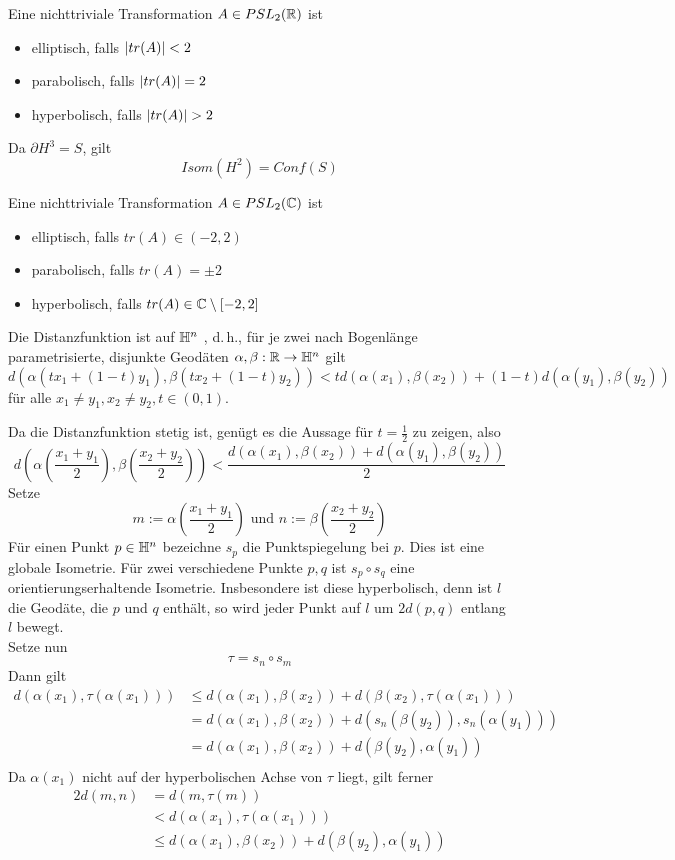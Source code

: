 \documentclass{book}
\begin{document}
\Prop{}
Eine nichttriviale Transformation $A \in PSL_2(\mathbb{R})$ ist
\begin{itemize}
	\item elliptisch, falls $\left|tr(A)\right| < 2$
	\item parabolisch, falls $\left|tr(A)\right| = 2$
	\item hyperbolisch, falls $\left|tr(A)\right| > 2$
\end{itemize}

\Prop{}
Da $\partial H^3 = S$, gilt
\[ Isom(H^2) = Conf(S) \]

\Prop{}
Eine nichttriviale Transformation $A \in PSL_2(\mathbb{C})$ ist
\begin{itemize}
	\item elliptisch, falls $tr(A) \in (-2, 2)$
	\item parabolisch, falls $tr(A) = \pm 2$
	\item hyperbolisch, falls $tr(A) \in \mathbb{C}\setminus [-2, 2]$
\end{itemize}

\Prop{}
Die Distanzfunktion ist auf $\mathbb{H}^n$ , d.\,h., für je zwei nach Bogenlänge parametrisierte, disjunkte Geodäten $\alpha, \beta : \mathbb{R} \overset{}{\rightarrow} \mathbb{H}^n$ gilt
\[ d(\alpha(t  x_1 + (1-t)  y_1), \beta(t  x_2 + (1-t)  y_2) ) < t  d(\alpha(x_1), \beta(x_2)) + (1-t)  d(\alpha(y_1), \beta(y_2) ) \]
für alle $x_1 \neq y_1, x_2 \neq y_2, t \in (0,1)$.
\begin{Beweis}{}
	Da die Distanzfunktion stetig ist, genügt es die Aussage für $t = \frac{1}{2}$ zu zeigen, also
	\[ d(\alpha(\frac{x_1 + y_1}{2}), \beta(\frac{x_2 + y_2}{2})) < \frac{d(\alpha(x_1), \beta(x_2) ) + d(\alpha(y_1), \beta(y_2))}{2}  \]
	Setze
	\[ m:= \alpha(\frac{x_1 + y_1}{2})  \text{ und }n:= \beta(\frac{x_2 + y_2}{2}) \]
	Für einen Punkt $p \in \mathbb{H}^n$ bezeichne $s_p$ die Punktspiegelung bei $p$. Dies ist eine globale Isometrie. Für zwei verschiedene Punkte $p,q$ ist $s_p \circ s_q$ eine orientierungserhaltende Isometrie. Insbesondere ist diese hyperbolisch, denn ist $l$ die Geodäte, die $p$ und $q$ enthält, so wird jeder Punkt auf $l$ um $2d(p,q)$ entlang $l$ bewegt.\\
	Setze nun
	\[ \tau = s_n \circ s_m \]
	Dann gilt
	\begin{align*}
	d(\alpha(x_1), \tau(\alpha(x_1)) ) & \leq d(\alpha(x_1), \beta(x_2) ) + d( \beta(x_2), \tau(\alpha(x_1)) )\\
	&=d(\alpha(x_1), \beta(x_2) ) + d(  s_n(\beta(y_2))  , s_n(\alpha(y_1))  )\\
		&=d(\alpha(x_1), \beta(x_2) ) + d(  \beta(y_2)  , \alpha(y_1)  )\\
	\end{align*}
	Da $\alpha(x_1)$ nicht auf der hyperbolischen Achse von $\tau$ liegt, gilt ferner
		\begin{align*}
2d(m,n) &= d(m, \tau(m))\\
&< d(\alpha(x_1), \tau(\alpha(x_1)))\\
&\leq d(\alpha(x_1), \beta(x_2) ) + d(  \beta(y_2)  , \alpha(y_1)  )
	\end{align*}
\end{Beweis}
\end{document}
